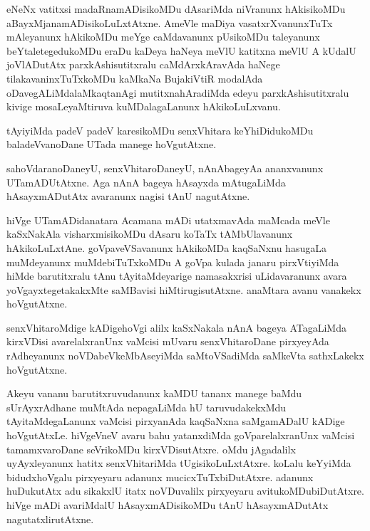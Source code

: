 \documentclass{article}
\begin{document}
\begin{mn}%
eNeNx vatitxsi madaRnamADisikoMDu dAsariMda niVranunx hAkisikoMDu 
aBayxMjanamADisikoLuLxtAtxne. AmeVle maDiya vasatxrXvanunxTuTx mAleyanunx hAkikoMDu meYge 
caMdavanunx pUsikoMDu taleyanunx beYtaletegedukoMDu eraDu kaDeya haNeya meVlU katitxna 
meVlU A kUdalU joVlADutAtx parxkAshisutitxralu caMdArxkAravAda haNege 
tilakavaninxTuTxkoMDu kaMkaNa BujakiVtiR modalAda oDavegALiMdalaMkaqtanAgi 
mutitxnahAradiMda edeyu parxkAshisutitxralu kivige mosaLeyaMtiruva kuMDalagaLanunx 
hAkikoLuLxvanu.
\end{mn}

\begin{mn}%
tAyiyiMda padeV padeV karesikoMDu senxVhitara keYhiDidukoMDu baladeVvanoDane UTada manege 
hoVgutAtxne.
\end{mn}

\begin{mn}%
sahoVdaranoDaneyU, senxVhitaroDaneyU, nAnAbageyAa ananxvanunx UTamADUtAtxne. Aga nAnA 
bageya hAsayxda mAtugaLiMda hAsayxmADutAtx avaranunx nagisi tAnU nagutAtxne.
\end{mn}

\begin{mn}%
hiVge UTamADidanatara Acamana mADi utatxmavAda maMcada meVle kaSxNakAla visharxmisikoMDu 
dAsaru koTaTx tAMbUlavanunx hAkikoLuLxtAne. goVpaveVSavanunx hAkikoMDa kaqSaNxnu hasugaLa 
muMdeyanunx muMdebiTuTxkoMDu A goVpa kulada janaru pirxVtiyiMda hiMde barutitxralu tAnu 
tAyitaMdeyarige namasakxrisi uLidavaranunx avara yoVgayxtegetakakxMte saMBavisi 
hiMtirugisutAtxne. anaMtara avanu vanakekx hoVgutAtxne.
\end{mn}

\begin{mn}%
senxVhitaroMdige kADigehoVgi alilx kaSxNakala nAnA bageya ATagaLiMda kirxVDisi 
avarelalxranUnx vaMcisi mUvaru senxVhitaroDane pirxyeyAda rAdheyanunx noVDabeVkeMbAseyiMda 
saMtoVSadiMda saMkeVta sathxLakekx hoVgutAtxne.
\end{mn}

\begin{mn}%
Akeyu vananu barutitxruvudanunx kaMDU tananx manege baMdu sUrAyxrAdhane muMtAda 
nepagaLiMda hU taruvudakekxMdu tAyitaMdegaLanunx vaMcisi pirxyanAda kaqSaNxna saMgamADalU 
kADige hoVgutAtxLe. hiVgeVneV avaru bahu yatanxdiMda goVparelalxranUnx vaMcisi 
tamamxvaroDane seVrikoMDu kirxVDisutAtxre. oMdu jAgadalilx uyAyxleyanunx hatitx 
senxVhitariMda tUgisikoLuLxtAtxre. koLalu keYyiMda bidudxhoVgalu pirxyeyaru adanunx 
mucicxTuTxbiDutAtxre. adanunx huDukutAtx adu sikakxlU itatx noVDuvalilx pirxyeyaru 
avitukoMDubiDutAtxre. hiVge mADi avariMdalU hAsayxmADisikoMDu tAnU hAsayxmADutAtx 
nagutatxlirutAtxne. 
\end{mn}
\end{document}
